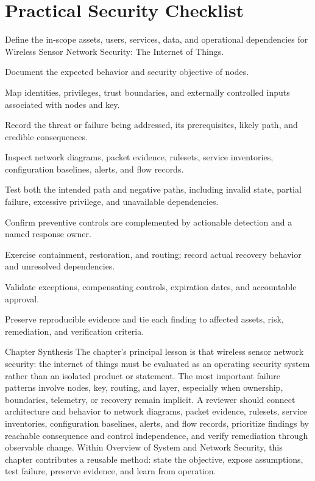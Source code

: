 \documentclass[11pt,letterpaper]{article}
\begin{document}
\section*{Practical Security Checklist}
\begin{CornellChecklist}
\item Define the in-scope assets, users, services, data, and operational dependencies for Wireless Sensor Network Security: The Internet of Things.
\item Document the expected behavior and security objective of nodes.
\item Map identities, privileges, trust boundaries, and externally controlled inputs associated with nodes and key.
\item Record the threat or failure being addressed, its prerequisites, likely path, and credible consequences.
\item Inspect network diagrams, packet evidence, rulesets, service inventories, configuration baselines, alerts, and flow records.
\item Test both the intended path and negative paths, including invalid state, partial failure, excessive privilege, and unavailable dependencies.
\item Confirm preventive controls are complemented by actionable detection and a named response owner.
\item Exercise containment, restoration, and routing; record actual recovery behavior and unresolved dependencies.
\item Validate exceptions, compensating controls, expiration dates, and accountable approval.
\item Preserve reproducible evidence and tie each finding to affected assets, risk, remediation, and verification criteria.
\end{CornellChecklist}
\begin{CornellSummaryBox}{Chapter Synthesis}
The chapter's principal lesson is that wireless sensor network security: the internet of things must be evaluated as an operating security system rather than an isolated product or statement. The most important failure patterns involve nodes, key, routing, and layer, especially when ownership, boundaries, telemetry, or recovery remain implicit. A reviewer should connect architecture and behavior to network diagrams, packet evidence, rulesets, service inventories, configuration baselines, alerts, and flow records, prioritize findings by reachable consequence and control independence, and verify remediation through observable change. Within Overview of System and Network Security, this chapter contributes a reusable method: state the objective, expose assumptions, test failure, preserve evidence, and learn from operation.
\end{CornellSummaryBox}
\end{document}
